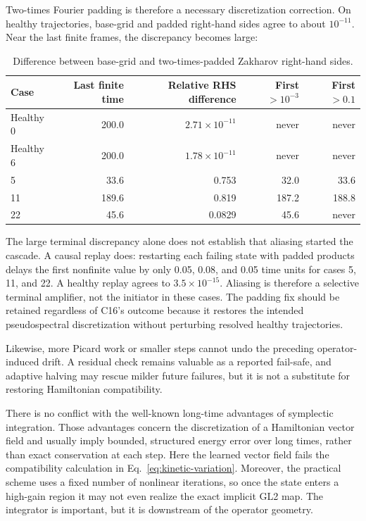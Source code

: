 \documentclass[11pt]{article}
\begin{document}
Two-times Fourier padding is therefore a necessary discretization correction.
On healthy trajectories, base-grid and padded right-hand sides agree to about
\(10^{-11}\).  Near the last finite frames, the discrepancy becomes large:
\begin{table}[ht]
\centering
\small
\begin{tabular}{lrrrr}
\toprule
Case & Last finite time & Relative RHS difference & First $>10^{-3}$ & First $>0.1$ \\
\midrule
Healthy 0 & 200.0 & $2.71\times10^{-11}$ & never & never \\
Healthy 6 & 200.0 & $1.78\times10^{-11}$ & never & never \\
5 & 33.6 & 0.753 & 32.0 & 33.6 \\
11 & 189.6 & 0.819 & 187.2 & 188.8 \\
22 & 45.6 & 0.0829 & 45.6 & never \\
\bottomrule
\end{tabular}
\caption{Difference between base-grid and two-times-padded Zakharov right-hand
sides.}
\label{tab:rhs-alias}
\end{table}

The large terminal discrepancy alone does not establish that aliasing started
the cascade.  A causal replay does: restarting each failing state with padded
products delays the first nonfinite value by only 0.05, 0.08, and 0.05 time
units for cases 5, 11, and 22.  A healthy replay agrees to
\(3.5\times10^{-15}\).  Aliasing is therefore a selective terminal amplifier,
not the initiator in these cases.  The padding fix should be retained
regardless of C16's outcome because it restores the intended pseudospectral
discretization without perturbing resolved healthy trajectories.

Likewise, more Picard work or smaller steps cannot undo the preceding
operator-induced drift.  A residual check remains valuable as a reported
fail-safe, and adaptive halving may rescue milder future failures, but it is not
a substitute for restoring Hamiltonian compatibility.

There is no conflict with the well-known long-time advantages of symplectic
integration.  Those advantages concern the discretization of a Hamiltonian
vector field and usually imply bounded, structured energy error over long
times, rather than exact conservation at each step.  Here the learned vector
field fails the compatibility calculation in
Eq.~\eqref{eq:kinetic-variation}.  Moreover, the practical scheme uses a fixed
number of nonlinear iterations, so once the state enters a high-gain region it
may not even realize the exact implicit GL2 map.  The integrator is important,
but it is downstream of the operator geometry.
\end{document}
